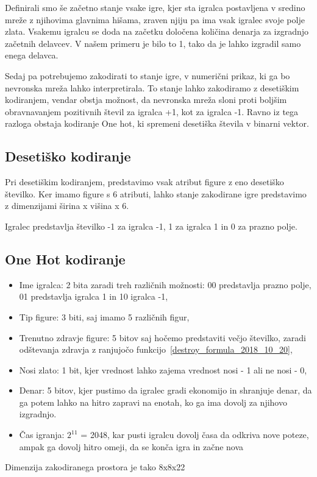 \documentclass[a4paper, 12pt]{book}
\begin{document}
Definirali smo še začetno stanje vsake igre, kjer sta igralca postavljena v sredino mreže z njihovima glavnima hišama, zraven njiju pa ima vsak igralec svoje polje zlata. Vsakemu igralcu se doda na začetku določena količina denarja za izgradnjo začetnih delavcev. V našem primeru je bilo to 1, tako da je lahko izgradil samo enega delavca.

Sedaj pa potrebujemo zakodirati to stanje igre, v numerični prikaz, ki ga bo nevronska mreža lahko interpretirala. To stanje lahko zakodiramo z desetiškim kodiranjem, vendar obstja možnost, da nevronska mreža sloni proti boljšim obravnavanjem pozitivnih števil za igralca +1, kot za igralca -1. Ravno iz tega razloga obstaja kodiranje One hot, ki spremeni desetiška števila v binarni vektor.

\subsection{Desetiško kodiranje}
Pri desetiškim kodiranjem, predstavimo vsak atribut figure z eno desetiško številko.
Ker imamo figure s 6 atributi, lahko stanje zakodirane igre predstavimo z dimenzijami širina x višina x 6.

Igralec predstavlja številko -1 za igralca -1, 1 za igralca 1 in 0 za prazno polje.


\subsection{One Hot kodiranje}
\begin{itemize}
	\item Ime igralca: 2 bita zaradi treh različnih možnosti: 00 predstavlja prazno polje, 01 predstavlja igralca 1 in 10 igralca -1,
	\item Tip figure: 3 biti, saj imamo 5 različnih figur,
	\item Trenutno zdravje figure: 5 bitov saj hočemo predstaviti večjo številko, zaradi odštevanja zdravja z ranjujočo funkcijo~\ref{destroy_formula_2018_10_20},
	\item Nosi zlato: 1 bit, kjer vrednost lahko zajema vrednost nosi - 1 ali ne nosi - 0,
	\item Denar: 5 bitov, kjer pustimo da igralec gradi ekonomijo in shranjuje denar, da ga potem lahko na hitro zapravi na enotah, ko ga ima dovolj za njihovo izgradnjo.
	\item Čas igranja: $2^{11}$ = 2048, kar pusti igralcu dovolj časa da odkriva nove poteze, ampak ga dovolj hitro omeji, da se konča igra in začne nova
\end{itemize}
Dimenzija zakodiranega prostora je tako 8x8x22
\end{document}
